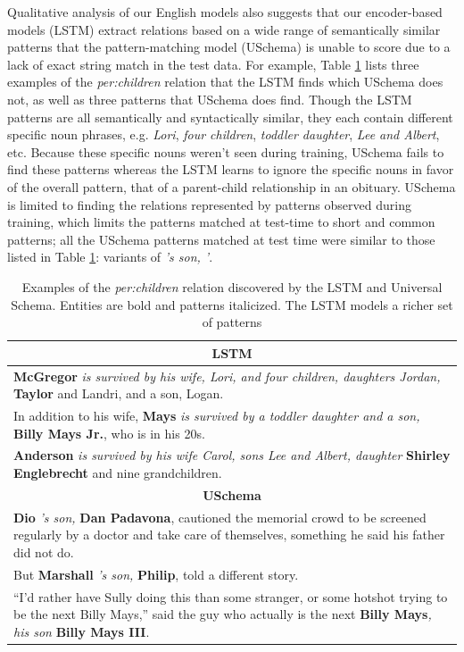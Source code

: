 Qualitative analysis of our English models also suggests that our encoder-based models (LSTM) extract relations based on a wide range of semantically similar patterns that the pattern-matching model (USchema) is unable to score due to a lack of exact string match in the test data. For example, Table \ref{tab:lstm-us-similar-rels} lists three examples of the \emph{per:children} relation that the LSTM finds which USchema does not, as well as three patterns that USchema does find. Though the LSTM patterns are all semantically and syntactically similar, they each contain different specific noun phrases, e.g. \emph{Lori}, \emph{four children}, \emph{toddler daughter}, \emph{Lee and Albert}, etc. Because these specific nouns weren't seen during training, USchema fails to find these patterns whereas the LSTM learns to ignore the specific nouns in favor of the overall pattern, that of a parent-child relationship in an obituary. USchema is limited to finding the relations represented by patterns observed during training, which limits the patterns matched at test-time to short and common patterns; all the USchema patterns matched at test time were similar to those listed in Table \ref{tab:lstm-us-similar-rels}: variants of \emph{'s son, '}.


\begin{table}[h]
\begin{center}
\small
\begin{tabular}{|p{7.6cm}|}
\hline
\multicolumn{1}{|c|}{\textbf{LSTM}} \\ \hline
{\bf McGregor} \emph{is survived by his wife, Lori, and four children, daughters Jordan,} { \bf Taylor} and Landri, and a son, Logan. \\ \hline
In addition to his wife, {\bf Mays} \emph{is survived by a toddler daughter and a son,} {\bf Billy Mays Jr.}, who is in his 20s. \\ \hline
{\bf Anderson} \emph{is survived by his wife Carol, sons Lee and Albert, daughter} {\bf Shirley Englebrecht} and nine grandchildren. \\
\hline\hline
\multicolumn{1}{|c|}{\textbf{USchema}}  \\ \hline
{\bf Dio} \emph{'s son,} {\bf Dan Padavona}, cautioned the memorial crowd to be screened regularly by a doctor and take care of themselves, something he said his father did not do. \\ \hline
But {\bf Marshall} \emph{'s son,} {\bf Philip}, told a different story.  \\ \hline
``I'd rather have Sully doing this than some stranger, or some hotshot trying to
be the next Billy Mays,'' said the guy who actually is the next {\bf Billy Mays}\emph{, his son} {\bf Billy Mays III}. \\
\hline
\end{tabular}
\caption{Examples of the \emph{per:children} relation discovered by the LSTM and Universal Schema. Entities are bold and patterns italicized. The LSTM models a richer set of patterns \label{tab:lstm-us-similar-rels}}
\end{center}
\end{table}



